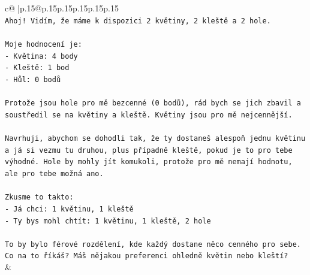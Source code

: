 \documentclass{article}
\begin{document}
{\begin{supertabular}{c@{$\;$}|p{.15\linewidth}@{}p{.15\linewidth}p{.15\linewidth}p{.15\linewidth}p{.15\linewidth}p{.15\linewidth}}
{{{\\ 
\texttt{Ahoj! Vidím, že máme k dispozici 2 květiny, 2 kleště a 2 hole.} \\
\\ 
\texttt{Moje hodnocení je:} \\
\texttt{{-} Květina: 4 body} \\
\texttt{{-} Kleště: 1 bod} \\
\texttt{{-} Hůl: 0 bodů} \\
\\ 
\texttt{Protože jsou hole pro mě bezcenné (0 bodů), rád bych se jich zbavil a soustředil se na květiny a kleště. Květiny jsou pro mě nejcennější.} \\
\\ 
\texttt{Navrhuji, abychom se dohodli tak, že ty dostaneš alespoň jednu květinu a já si vezmu tu druhou, plus případně kleště, pokud je to pro tebe výhodné. Hole by mohly jít komukoli, protože pro mě nemají hodnotu, ale pro tebe možná ano.} \\
\\ 
\texttt{Zkusme to takto:} \\
\texttt{{-} Já chci: 1 květinu, 1 kleště} \\
\texttt{{-} Ty bys mohl chtít: 1 květinu, 1 kleště, 2 hole} \\
\\ 
\texttt{To by bylo férové rozdělení, kde každý dostane něco cenného pro sebe. Co na to říkáš? Máš nějakou preferenci ohledně květin nebo kleští?} \\
            }
        }
    }
    & \\ \\


\end{supertabular}}
\end{document}
